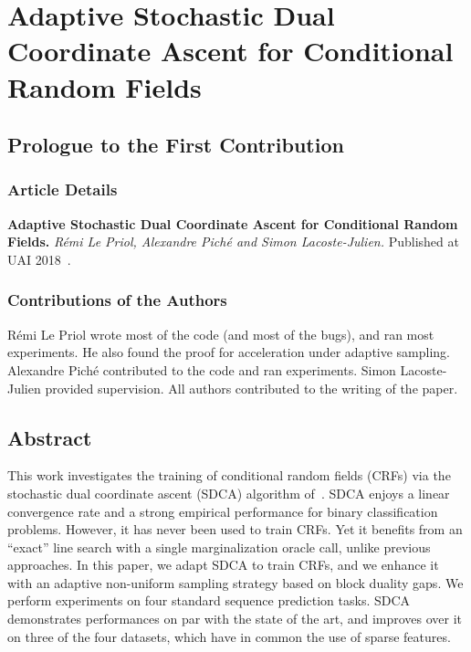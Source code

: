 \setcounter{theorem}{0}

\def\balpha{\boldsymbol{\alpha}}
\def\bmu{\boldsymbol{\mu}}
\def\bw{\boldsymbol{w}}
\newcommand{\bu}{\bm u}
\newcommand{\bv}{\bm v}
\newcommand{\strgconvex}{\mu}
\newcommand{\QM}{QM} %


\chapter{Adaptive Stochastic Dual Coordinate Ascent for Conditional Random Fields}

\section{Prologue to the First Contribution}

\subsection{Article Details}

\textbf{Adaptive Stochastic Dual Coordinate Ascent for Conditional Random Fields.} 
\emph{R\'emi Le Priol, Alexandre Pich\'e and Simon Lacoste-Julien.} 
Published at UAI 2018~\citep{lepriol2018adaptive}.

\subsection{Contributions of the Authors}
Rémi Le Priol wrote most of the code (and most of the bugs), and ran most experiments. 
He also found the proof for acceleration under adaptive sampling.
Alexandre Piché contributed to the code and ran experiments.
Simon Lacoste-Julien provided supervision.
All authors contributed to the writing of the paper.

 \section{Abstract}
This work investigates the training of conditional random fields (CRFs) via the stochastic dual coordinate ascent (SDCA) algorithm of~\citet{shalev2016accelerated}.
SDCA enjoys a linear convergence rate and a strong empirical performance for binary classification problems.
However, it has never been used to train CRFs.
Yet it benefits from an ``exact'' line search with a single marginalization oracle call, unlike previous approaches.
In this paper, we adapt SDCA to train CRFs, and we enhance it with an adaptive non-uniform sampling strategy based on block duality gaps.
We perform experiments on four standard sequence prediction tasks.
SDCA demonstrates performances on par with the state of the art, and improves over it on three of the four datasets, which have in common the use of sparse features.

